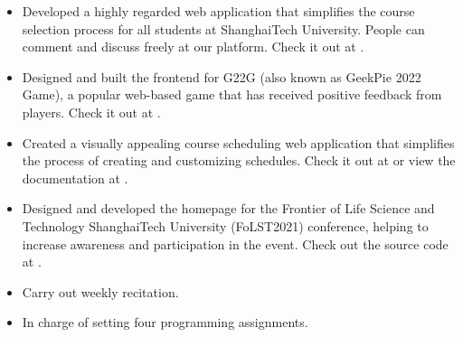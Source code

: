 \documentclass{resume}
\begin{document}

\begin{itemize}
  \item Developed a highly regarded web application that simplifies the course selection process for all students at ShanghaiTech University. People can comment and discuss freely at our platform. Check it out at .
  \item Designed and built the frontend for G22G (also known as GeekPie 2022 Game), a popular web-based game that has received positive feedback from players. Check it out at .
  \item Created a visually appealing course scheduling web application that simplifies the process of creating and customizing schedules. Check it out at  or view the documentation at .
  \item Designed and developed the homepage for the Frontier of Life Science and Technology ShanghaiTech University (FoLST2021) conference, helping to increase awareness and participation in the event. Check out the source code at .
\end{itemize}


\begin{itemize}
  \item Carry out weekly recitation.
  \item In charge of setting four programming assignments.
\end{itemize}

 
\end{document}

